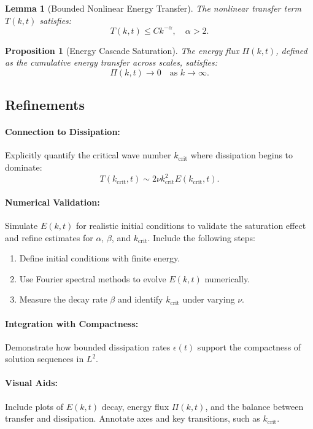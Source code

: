 \documentclass[12pt]{article}
\newtheorem{lemma}[theorem]{Lemma}
\newtheorem{proposition}[theorem]{Proposition}
\theoremstyle{definition}
\begin{document}
\begin{lemma}[Bounded Nonlinear Energy Transfer]
The nonlinear transfer term $T(k,t)$ satisfies:
\[
T(k,t) \leq C k^{-\alpha}, \quad \alpha > 2.
\]
\end{lemma}

\begin{proposition}[Energy Cascade Saturation]
The energy flux $\Pi(k,t)$, defined as the cumulative energy transfer across scales, satisfies:
\[
\Pi(k,t) \to 0 \quad \text{as } k \to \infty.
\]
\end{proposition}

\subsection{Refinements}

\paragraph{Connection to Dissipation:}
Explicitly quantify the critical wave number $k_{\text{crit}}$ where dissipation begins to dominate:
\[
T(k_{\text{crit}}, t) \sim 2\nu k_{\text{crit}}^2 E(k_{\text{crit}}, t).
\]

\paragraph{Numerical Validation:}
Simulate $E(k, t)$ for realistic initial conditions to validate the saturation effect and refine estimates for $\alpha$, $\beta$, and $k_{\text{crit}}$. Include the following steps:
\begin{enumerate}
    \item Define initial conditions with finite energy.
    \item Use Fourier spectral methods to evolve $E(k, t)$ numerically.
    \item Measure the decay rate $\beta$ and identify $k_{\text{crit}}$ under varying $\nu$.
\end{enumerate}

\paragraph{Integration with Compactness:}
Demonstrate how bounded dissipation rates $\epsilon(t)$ support the compactness of solution sequences in $L^2$.

\paragraph{Visual Aids:}
Include plots of $E(k, t)$ decay, energy flux $\Pi(k,t)$, and the balance between transfer and dissipation. Annotate axes and key transitions, such as $k_{\text{crit}}$.
\end{document}
